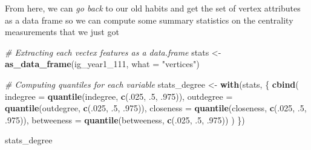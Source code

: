 \documentclass[]{book}
\newenvironment{Shaded}{\begin{snugshade}}{\end{snugshade}}
\newcommand{\KeywordTok}[1]{\textcolor[rgb]{0.13,0.29,0.53}{\textbf{#1}}}
\newcommand{\DataTypeTok}[1]{\textcolor[rgb]{0.13,0.29,0.53}{#1}}
\newcommand{\DecValTok}[1]{\textcolor[rgb]{0.00,0.00,0.81}{#1}}
\newcommand{\StringTok}[1]{\textcolor[rgb]{0.31,0.60,0.02}{#1}}
\newcommand{\CommentTok}[1]{\textcolor[rgb]{0.56,0.35,0.01}{\textit{#1}}}
\newcommand{\OtherTok}[1]{\textcolor[rgb]{0.56,0.35,0.01}{#1}}
\newcommand{\OperatorTok}[1]{\textcolor[rgb]{0.81,0.36,0.00}{\textbf{#1}}}
\newcommand{\NormalTok}[1]{#1}
\theoremstyle{definition}
\theoremstyle{definition}
\theoremstyle{definition}
\theoremstyle{remark}
\begin{document}
\begin{Shaded}
\end{Shaded}

From here, we can \emph{go back} to our old habits and get the set of
vertex attributes as a data frame so we can compute some summary
statistics on the centrality measurements that we just got

\begin{Shaded}
\begin{Highlighting}[]
\CommentTok{# Extracting each vectex features as a data.frame}
\NormalTok{stats <-}\StringTok{ }\KeywordTok{as_data_frame}\NormalTok{(ig_year1_}\DecValTok{111}\NormalTok{, }\DataTypeTok{what =} \StringTok{"vertices"}\NormalTok{)}

\CommentTok{# Computing quantiles for each variable}
\NormalTok{stats_degree <-}\StringTok{ }\KeywordTok{with}\NormalTok{(stats, \{}
 \KeywordTok{cbind}\NormalTok{(}
   \DataTypeTok{indegree   =} \KeywordTok{quantile}\NormalTok{(indegree, }\KeywordTok{c}\NormalTok{(.}\DecValTok{025}\NormalTok{, .}\DecValTok{5}\NormalTok{, .}\DecValTok{975}\NormalTok{)),}
   \DataTypeTok{outdegree  =} \KeywordTok{quantile}\NormalTok{(outdegree, }\KeywordTok{c}\NormalTok{(.}\DecValTok{025}\NormalTok{, .}\DecValTok{5}\NormalTok{, .}\DecValTok{975}\NormalTok{)),}
   \DataTypeTok{closeness  =} \KeywordTok{quantile}\NormalTok{(closeness, }\KeywordTok{c}\NormalTok{(.}\DecValTok{025}\NormalTok{, .}\DecValTok{5}\NormalTok{, .}\DecValTok{975}\NormalTok{)),}
   \DataTypeTok{betweeness =} \KeywordTok{quantile}\NormalTok{(betweeness, }\KeywordTok{c}\NormalTok{(.}\DecValTok{025}\NormalTok{, .}\DecValTok{5}\NormalTok{, .}\DecValTok{975}\NormalTok{))}
\NormalTok{ )}
\NormalTok{\})}

\NormalTok{stats_degree}
\end{Highlighting}
\end{Shaded}
\end{document}
